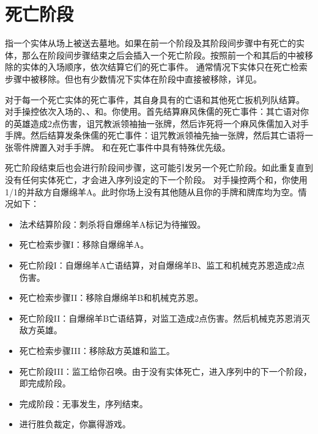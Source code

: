\section{死亡阶段}
\label{death-phase}

指一个实体从场上被送去墓地。如果在前一个阶段及其阶段间步骤中有死亡的实体，那么在阶段间步骤结束之后会插入一个死亡阶段。按照前一个和其后的中被移除的实体的入场顺序，依次结算它们的死亡事件。
\notice 通常情况下实体只在死亡检索步骤中被移除。但也有少数情况下实体在阶段中直接被移除，详见。

对于每一个死亡实体的死亡事件，其自身具有的亡语和其他死亡扳机列队结算。
\example 对手操控依次入场的、、和。你使用。首先结算麻风侏儒的死亡事件：其亡语对你的英雄造成2点伤害，诅咒教派领袖抽一张牌，然后诈死将一个麻风侏儒加入对手手牌。然后结算发条侏儒的死亡事件：诅咒教派领袖先抽一张牌，然后其亡语将一张零件牌置入对手手牌。
\notice {}和在死亡事件中具有特殊优先级。

死亡阶段结束后也会进行阶段间步骤，这可能引发另一个死亡阶段。如此重复直到没有任何实体死亡，才会进入序列设定的下一个阶段。
\example 对手操控两个和，你使用1/1的并敌方自爆绵羊A。此时你场上没有其他随从且你的手牌和牌库均为空。情况如下：

\begin{itemize}
    \item 法术结算阶段：刺杀将自爆绵羊A标记为待摧毁。
    \item 死亡检索步骤I：移除自爆绵羊A。
    \item 死亡阶段I：自爆绵羊A亡语结算，对自爆绵羊B、监工和机械克苏恩造成2点伤害。
    \item 死亡检索步骤II：移除自爆绵羊B和机械克苏恩。
    \item 死亡阶段II：自爆绵羊B亡语结算，对监工造成2点伤害。然后机械克苏恩消灭敌方英雄。
    \item 死亡检索步骤III：移除敌方英雄和监工。
    \item 死亡阶段III：监工给你召唤。由于没有实体死亡，进入序列中的下一个阶段，即完成阶段。
    \item 完成阶段：无事发生，序列结束。
    \item 进行胜负裁定，你赢得游戏。
\end{itemize}